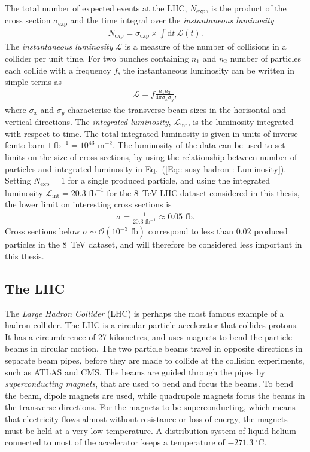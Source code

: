 \documentclass[twoside,english]{uiofysmaster}
\begin{document}
{The total number of expected events at the LHC, $N_{\mathrm{exp}}$, is the product of the cross section $\sigma_{\mathrm{exp}}$ and the time integral over the \textit{instantaneous luminosity}
\begin{align}\label{Eq:: susy hadron : Luminosity}
N_{\mathrm{exp}} = \sigma_{\mathrm{exp}} \times \int \mathrm{d}t~ \mathscr{L}(t).
\end{align}
The \textit{instantaneous luminosity} $\mathscr{L}$ is a measure of the number of collisions in a collider per unit time. For two bunches containing $n_1$ and $n_2$ number of particles each collide with a frequency $f$, the instantaneous luminosity can be written in simple terms as
\begin{align}
\mathscr{L} = f \frac{n_1 n_2}{4 \pi \sigma_x \sigma_y},
\end{align}
where $\sigma_x$ and $\sigma_y$ characterise the transverse beam sizes in the horisontal and vertical directions. The \textit{integrated luminosity}, $\mathscr{L}_{\mathrm{int}}$, is the luminosity integrated with respect to time. The total integrated luminosity is given in units of inverse femto-barn $1~\mathrm{fb}^{-1} = 10^{43} \text{ m}^{-2}$. The luminosity of the data can be used to set limits on the size of cross sections, by using the relationship between number of particles and integrated luminosity in Eq.~(\ref{Eq:: susy hadron : Luminosity}). Setting $N_{\mathrm{exp}}=1$ for a single produced particle, and using the integrated luminosity $\mathscr{L}_{\mathrm{int}} = 20.3 \text{ fb}^{-1}$ for the 8~TeV LHC dataset considered in this thesis, the lower limit on interesting cross sections is
\begin{align}
\sigma  = \frac{1}{20.3 \text{ fb}^{-1}} \approx 0.05 \text{ fb}.
\end{align}
Cross sections below $\sigma \sim \mathcal{O}(10^{-3} \text{ fb})$ correspond to less than $0.02$ produced particles in the 8~TeV dataset, and will therefore be considered less important in this thesis. 

\subsection{The LHC}

The \textit{Large Hadron Collider} (LHC) is perhaps the most famous example of a hadron collider. The LHC is a circular particle accelerator that collides protons. It has a circumference of 27 kilometres, and uses magnets to bend the particle beams in circular motion. The two particle beams travel in opposite directions in separate beam pipes, before they are made to collide at the collision experiments, such as ATLAS and CMS. The beams are guided through the pipes by \textit{superconducting magnets}, that are used to bend and focus the beams. To bend the beam, dipole magnets are used, while quadrupole magnets focus the beams in the transverse directions. For the magnets to be superconducting, which means that electricity flows almost without resistance or loss of energy, the magnets must be held at a very low temperature. A distribution system of liquid helium connected to most of the accelerator keeps a temperature of $-271.3~ ^{\circ}\mathrm{C}$. 


}
\end{document}
